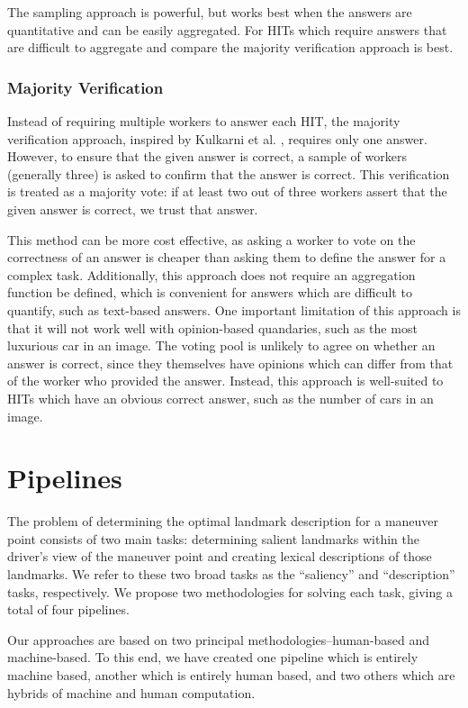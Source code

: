The sampling approach is powerful, but works best when the answers are quantitative and can be easily aggregated. For HITs which require answers that are difficult to aggregate and compare the majority verification approach is best.

\subsubsection{Majority Verification}

Instead of requiring multiple workers to answer each HIT, the majority verification approach, inspired by Kulkarni et al. \cite{kulkarni2011turkomatic}, requires only one answer. However, to ensure that the given answer is correct, a sample of workers (generally three) is asked to confirm that the answer is correct. This verification is treated as a majority vote: if at least two out of three workers assert that the given answer is correct, we trust that answer. 

This method can be more cost effective, as asking a worker to vote on the correctness of an answer is cheaper than asking them to define the answer for a complex task. Additionally, this approach does not require an aggregation function be defined, which is convenient for answers which are difficult to quantify, such as text-based answers. One important limitation of this approach is that it will not work well with opinion-based quandaries, such as the most luxurious car in an image. The voting pool is unlikely to agree on whether an answer is correct, since they themselves have opinions which can differ from that of the worker who provided the answer. Instead, this approach is well-suited to HITs which have an obvious correct answer, such as the number of cars in an image.

\section{Pipelines}
The problem of determining the optimal landmark description for a maneuver point consists of two main tasks: determining salient landmarks within the driver’s view of the maneuver point and creating lexical descriptions of those landmarks. We refer to these two broad tasks as the “saliency” and “description” tasks, respectively. We propose two methodologies for solving each task, giving a total of four pipelines. 

Our approaches are based on two principal methodologies--human-based and machine-based. To this end, we have created one pipeline which is entirely machine based, another which is entirely human based, and two others which are hybrids of machine and human computation.

